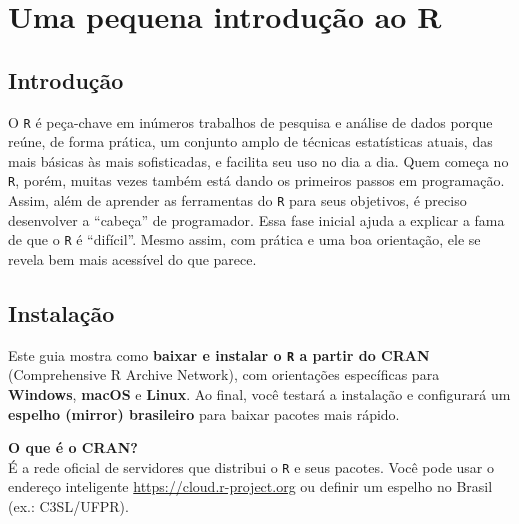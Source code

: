 \documentclass[
  letterpaper,
  DIV=11,
  numbers=noendperiod]{scrreprt}
\begin{document}

\chapter{Uma pequena introdução ao
R}\label{uma-pequena-introduuxe7uxe3o-ao-r}

\section{Introdução}\label{introduuxe7uxe3o-1}

O \texttt{R} é peça-chave em inúmeros trabalhos de pesquisa e análise de
dados porque reúne, de forma prática, um conjunto amplo de técnicas
estatísticas atuais, das mais básicas às mais sofisticadas, e facilita
seu uso no dia a dia. Quem começa no \texttt{R}, porém, muitas vezes
também está dando os primeiros passos em programação. Assim, além de
aprender as ferramentas do \texttt{R} para seus objetivos, é preciso
desenvolver a ``cabeça'' de programador. Essa fase inicial ajuda a
explicar a fama de que o \texttt{R} é ``difícil''. Mesmo assim, com
prática e uma boa orientação, ele se revela bem mais acessível do que
parece.

\section*{Instalação}\label{instalauxe7uxe3o}


Este guia mostra como \textbf{baixar e instalar o \texttt{R} a partir do
CRAN} (Comprehensive R Archive Network), com orientações específicas
para \textbf{Windows}, \textbf{macOS} e \textbf{Linux}. Ao final, você
testará a instalação e configurará um \textbf{espelho (mirror)
brasileiro} para baixar pacotes mais rápido.

\begin{tcolorbox}[enhanced jigsaw, left=2mm, toprule=.15mm, opacityback=0, title=\textcolor{quarto-callout-note-color}{\faInfo}\hspace{0.5em}{Nota}, leftrule=.75mm, breakable, colbacktitle=quarto-callout-note-color!10!white, coltitle=black, rightrule=.15mm, bottomtitle=1mm, toptitle=1mm, colframe=quarto-callout-note-color-frame, colback=white, opacitybacktitle=0.6, bottomrule=.15mm, arc=.35mm, titlerule=0mm]

\textbf{O que é o CRAN?}\\
É a rede oficial de servidores que distribui o \texttt{R} e seus
pacotes. Você pode usar o endereço inteligente
\url{https://cloud.r-project.org} ou definir um espelho no Brasil (ex.:
C3SL/UFPR).

\end{tcolorbox}
\end{document}
